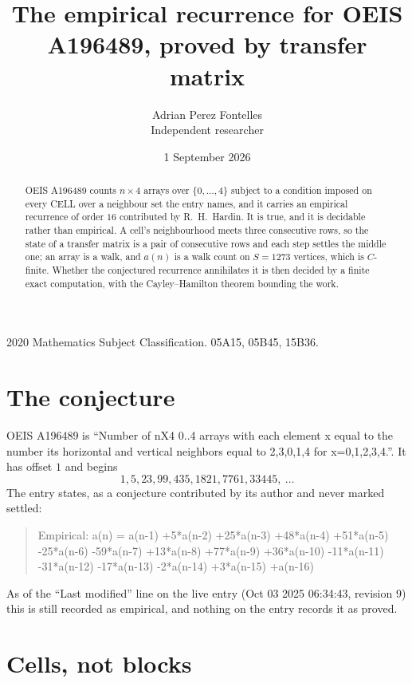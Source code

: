 \documentclass[11pt,a4paper]{article}
\title{The empirical recurrence for OEIS A196489, proved by transfer matrix}
\author{Adrian Perez Fontelles\\ \small Independent researcher}
\date{1 September 2026}
\theoremstyle{plain}
\theoremstyle{definition}
\begin{document}
\maketitle

\begin{abstract}
OEIS A196489 counts $n\times4$ arrays over $\{0,\dots,4\}$ subject to a condition imposed on
every CELL over a neighbour set the entry names, and it carries an empirical recurrence of
order $16$ contributed by R.~H.~Hardin. It is true, and it is decidable rather than
empirical. A cell's neighbourhood meets three consecutive rows, so the state of a transfer
matrix is a pair of consecutive rows and each step settles the middle one; an array is a
walk, and $a(n)$ is a walk count on $S=1273$ vertices, which is $C$-finite. Whether the
conjectured recurrence annihilates it is then decided by a finite exact computation, with the
Cayley--Hamilton theorem bounding the work.
\end{abstract}

\noindent\small 2020 Mathematics Subject Classification. 05A15, 05B45, 15B36.\normalsize

\section{The conjecture}

OEIS A196489 is ``Number of nX4 0..4 arrays with each element x equal to the number its horizontal and vertical neighbors equal to 2,3,0,1,4 for x=0,1,2,3,4.''. It has offset $1$ and begins
\[
1, 5, 23, 99, 435, 1821, 7761, 33445,\ \dots
\]
The entry states, as a conjecture contributed by its author and never marked settled:
\begin{quote}
Empirical: a(n) = a(n-1) +5*a(n-2) +25*a(n-3) +48*a(n-4) +51*a(n-5) -25*a(n-6) -59*a(n-7) +13*a(n-8) +77*a(n-9) +36*a(n-10) -11*a(n-11) -31*a(n-12) -17*a(n-13) -2*a(n-14) +3*a(n-15) +a(n-16)
\end{quote}
As of the ``Last modified'' line on the live entry (Oct 03 2025 06:34:43, revision 9) this is still
recorded as empirical, and nothing on the entry records it as proved.

\section{Cells, not blocks}
\end{document}
